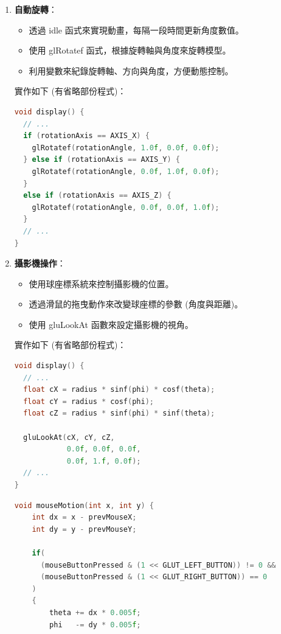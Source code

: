 \documentclass[12pt,a4paper]{article}
\begin{document}
\begin{enumerate}
  \item \textbf{自動旋轉}：
    \begin{itemize}
      \item 透過 idle 函式來實現動畫，每隔一段時間更新角度數值。
      \item 使用 glRotatef 函式，根據旋轉軸與角度來旋轉模型。
      \item 利用變數來紀錄旋轉軸、方向與角度，方便動態控制。
    \end{itemize}
    
    實作如下 (有省略部份程式)：
    \newpage
    \begin{lstlisting}[language=C++,breaklines=true]
void display() {
  // ...
  if (rotationAxis == AXIS_X) {
    glRotatef(rotationAngle, 1.0f, 0.0f, 0.0f); 
  } else if (rotationAxis == AXIS_Y) {
    glRotatef(rotationAngle, 0.0f, 1.0f, 0.0f); 
  }
  else if (rotationAxis == AXIS_Z) {
    glRotatef(rotationAngle, 0.0f, 0.0f, 1.0f); 
  }
  // ...
}
  \end{lstlisting}
   

  \item \textbf{攝影機操作}：
  \begin{itemize}
    \item 使用球座標系統來控制攝影機的位置。
    \item 透過滑鼠的拖曳動作來改變球座標的參數 (角度與距離)。
    \item 使用 gluLookAt 函數來設定攝影機的視角。
  \end{itemize}
  
  實作如下 (有省略部份程式)：
  \newline
  \begin{lstlisting}[language=C++,breaklines=true]
void display() {
  // ...
  float cX = radius * sinf(phi) * cosf(theta);
  float cY = radius * cosf(phi);
  float cZ = radius * sinf(phi) * sinf(theta);

  gluLookAt(cX, cY, cZ,    
            0.0f, 0.0f, 0.0f,   
            0.0f, 1.f, 0.0f);  
  // ...
}
\end{lstlisting}
\newpage
\begin{lstlisting}[language=C++,breaklines=true]
void mouseMotion(int x, int y) {
    int dx = x - prevMouseX;
    int dy = y - prevMouseY;

    if(
      (mouseButtonPressed & (1 << GLUT_LEFT_BUTTON)) != 0 &&
      (mouseButtonPressed & (1 << GLUT_RIGHT_BUTTON)) == 0
    ) 
    {
        theta += dx * 0.005f; 
        phi   -= dy * 0.005f;


\end{lstlisting}
\end{enumerate}
\end{document}

